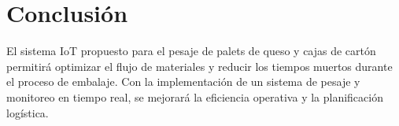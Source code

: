\documentclass{article}
\begin{document}
\section{Conclusión}
El sistema IoT propuesto para el pesaje de palets de queso y cajas de cartón permitirá optimizar el flujo de materiales y reducir los tiempos muertos durante el proceso de embalaje. Con la implementación de un sistema de pesaje y monitoreo en tiempo real, se mejorará la eficiencia operativa y la planificación logística.
\end{document}
